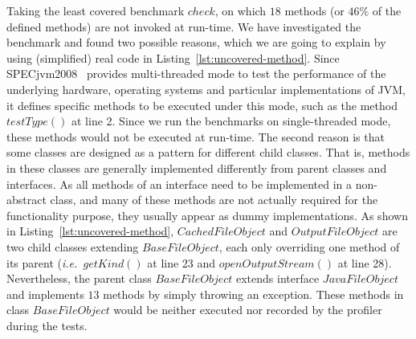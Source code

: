 \documentclass{fac}
\newcommand\ie{\textit{i.e.\ }}
\begin{document}
Taking the least covered benchmark $check$, on which $18$ methods (or $46\%$ of the defined methods) are not invoked at run-time.
We have investigated the benchmark and found two possible reasons, which we are going to explain by using (simplified) real code in Listing~\ref{lst:uncovered-method}.
Since SPECjvm2008~\cite{specjvm} provides multi-threaded mode to test the performance of the underlying hardware, operating systems and particular implementations of JVM, it defines specific methods to be executed under this mode, such as the method $testType()$ at line 2. Since we run the benchmarks on single-threaded mode, these methods would not be executed at run-time. %
The second reason is that some classes are designed as a pattern for different child classes. That is, methods in these classes are generally implemented differently from parent classes and interfaces. As all methods of an interface need to be implemented in a non-abstract class, and many of these methods are not actually required for the functionality purpose, they usually appear as dummy implementations.
As shown in Listing~\ref{lst:uncovered-method}, $CachedFileObject$ and $OutputFileObject$ are two child classes extending $BaseFileObject$, %
each only overriding one method of its parent (\ie $getKind()$ at line 23 and $openOutputStream()$ at line 28). Nevertheless, the parent class $BaseFileObject$ extends interface $JavaFileObject$ and implements $13$ methods by simply throwing an exception. These methods in class $BaseFileObject$ would be neither executed nor recorded by the profiler during the tests.
\end{document}
